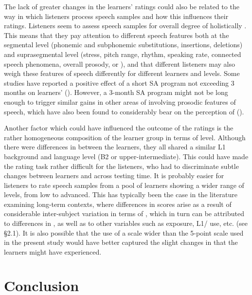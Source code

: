 \documentclass[output=paper]{langsci/langscibook}
\begin{document}
The lack of greater changes in the learners’  ratings could also be related to the way in which listeners process speech samples and how this influences their  ratings. Listeners seem to assess speech samples for overall degree of  holistically \citep{Magen1998}. This means that they pay attention to different speech features both at the segmental level (phonemic and subphonemic substitutions, insertions, deletions) and suprasegmental level (stress, pitch range, rhythm, speaking rate, connected speech phenomena, overall prosody, or ), and that different listeners may also weigh these features of speech differently for different  learners and  levels. Some studies have reported a positive effect of a short SA program not exceeding 3 months on learners’  (\citealt{Díaz-Campos2004,Díaz-Campos2006,Mora2008,SanzEtAl2013}). However, a 3-month SA program might not be long enough to trigger similar gains in other areas of  involving prosodic features of speech, which have also been found to considerably bear on the perception of  (\citealt{Anderson-HsiehEtAl1992,MunroDerwing1999}).

Another factor which could have influenced the outcome of the  ratings is the rather homogeneous composition of the learner group in terms of   level. Although there were differences in  between the learners, they all shared a similar L1 background and   language level (B2 or upper-intermediate). This could have made the rating task rather difficult for the listeners, who had to discriminate subtle  changes between learners and across testing time. It is probably easier for listeners to rate speech samples from a pool of learners showing a wider range of  levels, from low to advanced. This has typically been the case in the  literature examining long-term  contexts, where differences in  scores arise as a result of considerable inter-subject variation in terms of  , which in turn can be attributed to differences in , as well as to other variables such as  exposure, L1/ use, etc. (see §2.1). It is also possible that the use of a scale wider than the 5-point scale used in the present study would have better captured the slight changes in  that the learners might have experienced.  


\section{Conclusion}
\end{document}
